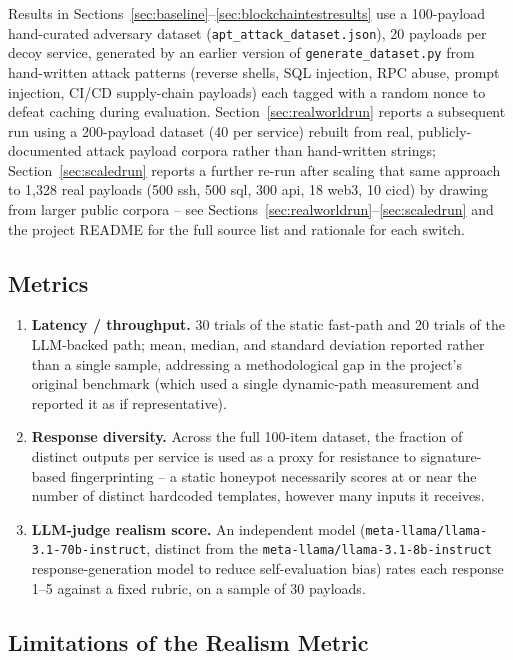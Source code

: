 \documentclass[conference]{IEEEtran}
\begin{document}
Results in Sections~\ref{sec:baseline}--\ref{sec:blockchaintestresults} use a
100-payload hand-curated adversary dataset
(\texttt{apt\_attack\_dataset.json}), 20 payloads per decoy service,
generated by an earlier version of \texttt{generate\_dataset.py} from
hand-written attack patterns (reverse shells, SQL injection, RPC abuse,
prompt injection, CI/CD supply-chain payloads) each tagged with a random
nonce to defeat caching during evaluation. Section~\ref{sec:realworldrun}
reports a subsequent run using a 200-payload dataset (40 per service)
rebuilt from real, publicly-documented attack payload corpora rather than
hand-written strings; Section~\ref{sec:scaledrun} reports a further re-run
after scaling that same approach to 1{,}328 real payloads (500 ssh, 500
sql, 300 api, 18 web3, 10 cicd) by drawing from larger public corpora --
see Sections~\ref{sec:realworldrun}--\ref{sec:scaledrun} and the project
README for the full source list and rationale for each switch.

\subsection{Metrics}

\begin{enumerate}
\item \textbf{Latency / throughput.} 30 trials of the static fast-path and
20 trials of the LLM-backed path; mean, median, and standard deviation
reported rather than a single sample, addressing a methodological gap in the
project's original benchmark (which used a single dynamic-path measurement
and reported it as if representative).
\item \textbf{Response diversity.} Across the full 100-item dataset, the
fraction of distinct outputs per service is used as a proxy for resistance
to signature-based fingerprinting -- a static honeypot necessarily scores at
or near the number of distinct hardcoded templates, however many inputs it
receives.
\item \textbf{LLM-judge realism score.} An independent model
(\texttt{meta-llama/llama-3.1-70b-instruct}, distinct from the
\texttt{meta-llama/llama-3.1-8b-instruct} response-generation model to
reduce self-evaluation bias) rates each response 1--5 against a fixed
rubric, on a sample of 30 payloads.
\end{enumerate}

\subsection{Limitations of the Realism Metric}
\label{sec:realismlimits}
\end{document}
